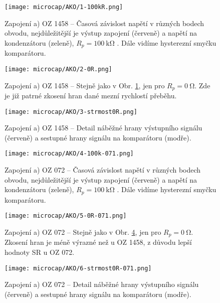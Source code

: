 
\begin{figure}[h!]
    \centering
    \texttt{[image: microcap/AKO/1-100kR.png]}
    \caption{Zapojení a) OZ 1458 -- Časová závislost napětí v různých bodech obvodu, nejdůležitější je výstup zapojení (červeně) a napětí na kondenzátoru (zeleně), \(R_{p} =\qty{100}{\kilo\ohm}\) . Dále vidíme hysterezní smyčku komparátoru.}
    \label{fig:microcap/AKO/1-100kR.png}
\end{figure}

\begin{figure}[h!]
    \centering
    \texttt{[image: microcap/AKO/2-0R.png]}
    \caption{Zapojení a) OZ 1458 -- Stejně jako v Obr. \ref{fig:microcap/AKO/1-100kR.png}, jen pro \(R_{p} =\qty{0}{\ohm}\). Zde je již patrné zkosení hran dané mezní rychlostí přeběhu.}
    \label{fig:microcap/AKO/2-0R.png}
\end{figure}

\begin{figure}[h!]
    \centering
    \texttt{[image: microcap/AKO/3-strmost0R.png]}
    \caption{Zapojení a) OZ 1458 -- Detail náběžné hrany výstupního signálu (červeně) a sestupné hrany signálu na komparátoru (modře).}
    \label{fig:microcap/AKO/3-strmost0R.png}
\end{figure}

\begin{figure}[h!]
    \centering
    \texttt{[image: microcap/AKO/4-100k-071.png]}
    \caption{Zapojení a) OZ 072 -- Časová závislost napětí v různých bodech obvodu, nejdůležitější je výstup zapojení (červeně) a napětí na kondenzátoru (zeleně), \(R_{p} =\qty{100}{\kilo\ohm}\) . Dále vidíme hysterezní smyčku komparátoru.}
    \label{fig:microcap/AKO/4-100k-071.png}
\end{figure}

\begin{figure}[h!]
    \centering
    \texttt{[image: microcap/AKO/5-0R-071.png]}
    \caption{Zapojení a) OZ 072 -- Stejně jako v Obr. \ref{fig:microcap/AKO/4-100k-071.png}, jen pro \(R_{p} =\qty{0}{\ohm}\). Zkosení hran je méně výrazné než u OZ 1458, z důvodu lepší hodnoty SR u OZ 072.}
    \label{fig:microcap/AKO/5-0R-071.png}
\end{figure}

\begin{figure}[h!]
    \centering
    \texttt{[image: microcap/AKO/6-strmost0R-071.png]}
    \caption{Zapojení a) OZ 072 -- Detail náběžné hrany výstupního signálu (červeně) a sestupné hrany signálu na komparátoru (modře).}
    \label{fig:microcap/AKO/6-strmost0R-071.png}
\end{figure}

